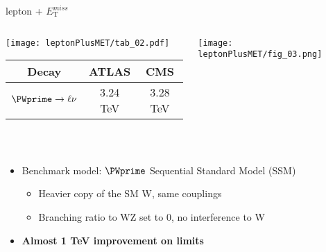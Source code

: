 \documentclass[8pt]{beamer}
\begin{document}
  \begin{frame}{\large lepton + $E_\mathrm{T}^{miss}$}
  
  \begin{columns}
   \begin{column}{5cm}
   
    {\centering
    \texttt{[image: leptonPlusMET/tab\_02.pdf]}\\
    }
   
	\begin{tabular}{c|cc}
	  \hline
	  \hline
	  Decay     &  ATLAS & CMS \\
	  \hline
	  \ensuremath{\PWprime\rightarrow \ell \nu} & 3.24 TeV & 3.28 TeV \\
	  \hline
	  \hline
	\end{tabular}
   \vspace{0.2cm}\\
   \end{column}
   \begin{column}{7cm}
    \texttt{[image: leptonPlusMET/fig\_03.png]}\\
    
   \end{column}
  \end{columns}
  
  \begin{itemize}
    \item Benchmark model: $\PWprime$ Sequential Standard Model (SSM)
      \begin{itemize}
	\item Heavier copy of the SM W, same couplings
	\item Branching ratio to WZ set to 0, no interference to W
      \end{itemize}
    \item {\bf Almost 1 TeV improvement on limits}
  \end{itemize}
  
 \end{frame}
\end{document}
